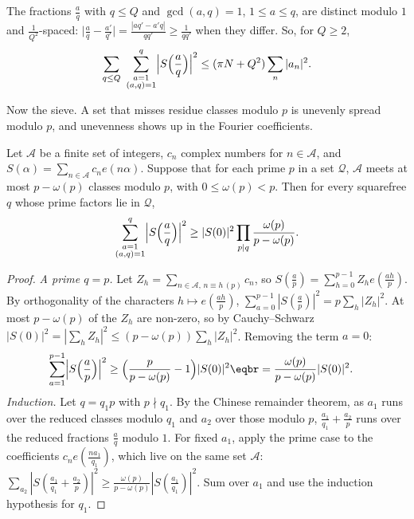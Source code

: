 The fractions $\frac aq$ with $q\le Q$ and $\gcd(a,q)=1$, $1\le a\le q$, are distinct modulo $1$ and $\frac1{Q^2}$-spaced: $\bigl|\frac aq-\frac{a'}{q'}\bigr|=\frac{|aq'-a'q|}{qq'}\ge\frac1{qq'}$ when they differ. So, for $Q\ge2$,
\begin{equation}\label{eq:arithls}
\sum_{q\le Q}\ \sum_{\substack{a=1\\(a,q)=1}}^q\Bigl|S\Bigl(\frac aq\Bigr)\Bigr|^2\le(\pi N+Q^2)\sum_n|a_n|^2.
\end{equation}

Now the sieve. A set that misses residue classes modulo $p$ is unevenly spread modulo $p$, and unevenness shows up in the Fourier coefficients.

\begin{lemma}\label{lem:lsprime}
Let $\mathcal A$ be a finite set of integers, $c_n$ complex numbers for $n\in\mathcal A$, and $S(\alpha)=\sum_{n\in\mathcal A}c_ne(n\alpha)$. Suppose that for each prime $p$ in a set $\mathcal Q$, $\mathcal A$ meets at most $p-\omega(p)$ classes
modulo $p$, with $0\le\omega(p)<p$. Then for every squarefree $q$ whose prime factors lie in $\mathcal Q$,
\[
\sum_{\substack{a=1\\(a,q)=1}}^q\Bigl|S\Bigl(\frac aq\Bigr)\Bigr|^2\ge|S(0)|^2\prod_{p\mid q}\frac{\omega(p)}{p-\omega(p)}.
\]
\end{lemma}
\begin{proof}
\emph{A prime $q=p$.} Let $Z_h=\sum_{n\in\mathcal A,\,n\equiv h\,(p)}c_n$, so $S(\frac ap)=\sum_{h=0}^{p-1}Z_he(\frac{ah}p)$. By orthogonality of the characters $h\mapsto e(\frac{ah}p)$, $\sum_{a=0}^{p-1}|S(\frac ap)|^2=p\sum_h|Z_h|^2$. At most $p-\omega(p)$ of the
$Z_h$ are non-zero, so by Cauchy--Schwarz $|S(0)|^2=|\sum_hZ_h|^2\le(p-\omega(p))\sum_h|Z_h|^2$. Removing the term $a=0$:
\[
\begin{aligned}\sum_{a=1}^{p-1}\Bigl|S\Bigl(\frac ap\Bigr)\Bigr|^2&\ge\Bigl(\frac p{p-\omega(p)}-1\Bigr)|S(0)|^2\eqbr=\frac{\omega(p)}{p-\omega(p)}|S(0)|^2.\end{aligned}
\]
\emph{Induction.} Let $q=q_1p$ with $p\nmid q_1$. By the Chinese remainder theorem, as $a_1$ runs over the reduced classes modulo $q_1$ and $a_2$ over those modulo $p$, $\frac{a_1}{q_1}+\frac{a_2}p$ runs over the
reduced fractions $\frac aq$ modulo $1$. For fixed $a_1$, apply the prime case to the coefficients $c_ne(\frac{na_1}{q_1})$, which live on the same set $\mathcal A$: $\sum_{a_2}|S(\frac{a_1}{q_1}+\frac{a_2}p)|^2\ge\frac{\omega(p)}{p-\omega(p)}|S(\frac{a_1}{q_1})|^2$.
Sum over $a_1$ and use the induction hypothesis for $q_1$.
\end{proof}

